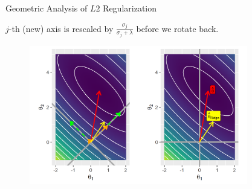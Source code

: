 \documentclass[11pt,compress,t,notes=noshow, xcolor=table]{beamer}
\begin{document}
\begin{vbframe}{Geometric Analysis of $L2$ Regularization}
  
$j$-th (new) axis is rescaled by $\frac{\sigma_j}{\sigma_j + \lambda}$ before we rotate back.

\begin{figure}
\includegraphics[width=0.85\textwidth]{figure/l2_reg_hess_03.png}\\
\end{figure}


\end{vbframe}
\end{document}
